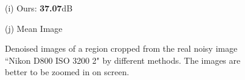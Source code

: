 \documentclass[10pt,onecolumn,letterpaper]{article}
\begin{document}
\begin{figure}[H]
{\begin{minipage}[t]{0.195\textwidth}
{\footnotesize (i) Ours: \textbf{37.07}dB}
\end{minipage}
\begin{minipage}[t]{0.195\textwidth}
\centering
{}
{\footnotesize (j) Mean Image \cite{crosschannel2016}}
\end{minipage}
}
\caption{Denoised images of a region cropped from the real noisy image ``Nikon D800 ISO 3200 2" \cite{crosschannel2016} by different methods. The images are better to be zoomed in on screen.}
\label{fig8}
\end{figure}
\end{document}

